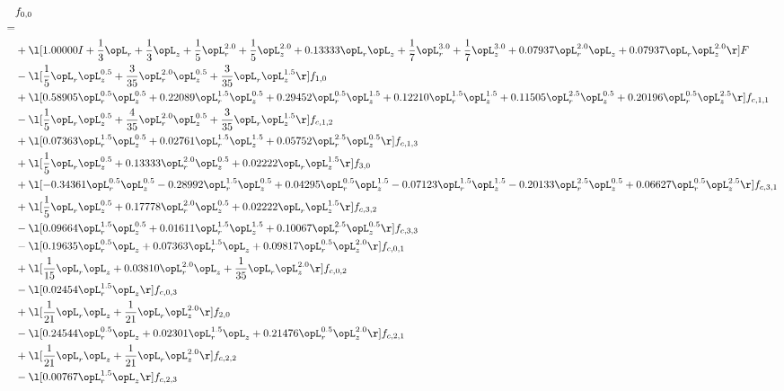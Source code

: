 \begin{alignat}{2} 
\label{eq:f_00_2} 
& f_{0,0} \nonumber \\ 
 = \\ 
& + \l[  1.00000 I + \frac{1}{3} \opL_r + \frac{1}{3} \opL_z + \frac{1}{5} \opL_r^{2.0} + \frac{1}{5} \opL_z^{2.0} +  0.13333 \opL_r \opL_z + \frac{1}{7} \opL_r^{3.0} + \frac{1}{7} \opL_z^{3.0} +  0.07937 \opL_r^{2.0} \opL_z +  0.07937 \opL_r \opL_z^{2.0}  \r] F \nonumber \\ 
& - \l[ \frac{1}{5} \opL_r \opL_z^{0.5} + \frac{3}{35} \opL_r^{2.0} \opL_z^{0.5} + \frac{3}{35} \opL_r \opL_z^{1.5}  \r] f_{1,0} \nonumber \\ 
& + \l[  0.58905 \opL_r^{0.5} \opL_z^{0.5} +  0.22089 \opL_r^{1.5} \opL_z^{0.5} +  0.29452 \opL_r^{0.5} \opL_z^{1.5} +  0.12210 \opL_r^{1.5} \opL_z^{1.5} +  0.11505 \opL_r^{2.5} \opL_z^{0.5} +  0.20196 \opL_r^{0.5} \opL_z^{2.5}  \r] f_{c,1,1} \nonumber \\ 
& - \l[ \frac{1}{5} \opL_r \opL_z^{0.5} + \frac{4}{35} \opL_r^{2.0} \opL_z^{0.5} + \frac{3}{35} \opL_r \opL_z^{1.5}  \r] f_{c,1,2} \nonumber \\ 
& + \l[  0.07363 \opL_r^{1.5} \opL_z^{0.5} +  0.02761 \opL_r^{1.5} \opL_z^{1.5} +  0.05752 \opL_r^{2.5} \opL_z^{0.5}  \r] f_{c,1,3} \nonumber \\ 
& + \l[ \frac{1}{5} \opL_r \opL_z^{0.5} +  0.13333 \opL_r^{2.0} \opL_z^{0.5} +  0.02222 \opL_r \opL_z^{1.5}  \r] f_{3,0} \nonumber \\ 
& + \l[  -0.34361 \opL_r^{0.5} \opL_z^{0.5}   -0.28992 \opL_r^{1.5} \opL_z^{0.5} +  0.04295 \opL_r^{0.5} \opL_z^{1.5}   -0.07123 \opL_r^{1.5} \opL_z^{1.5}   -0.20133 \opL_r^{2.5} \opL_z^{0.5} +  0.06627 \opL_r^{0.5} \opL_z^{2.5}  \r] f_{c,3,1} \nonumber \\ 
& + \l[ \frac{1}{5} \opL_r \opL_z^{0.5} +  0.17778 \opL_r^{2.0} \opL_z^{0.5} +  0.02222 \opL_r \opL_z^{1.5}  \r] f_{c,3,2} \nonumber \\ 
& - \l[  0.09664 \opL_r^{1.5} \opL_z^{0.5} +  0.01611 \opL_r^{1.5} \opL_z^{1.5} +  0.10067 \opL_r^{2.5} \opL_z^{0.5}  \r] f_{c,3,3} \nonumber \\ 
& - \l[  0.19635 \opL_r^{0.5} \opL_z +  0.07363 \opL_r^{1.5} \opL_z +  0.09817 \opL_r^{0.5} \opL_z^{2.0}  \r] f_{c,0,1} \nonumber \\ 
& + \l[ \frac{1}{15} \opL_r \opL_z +  0.03810 \opL_r^{2.0} \opL_z + \frac{1}{35} \opL_r \opL_z^{2.0}  \r] f_{c,0,2} \nonumber \\ 
& - \l[  0.02454 \opL_r^{1.5} \opL_z  \r] f_{c,0,3} \nonumber \\ 
& + \l[ \frac{1}{21} \opL_r \opL_z + \frac{1}{21} \opL_r \opL_z^{2.0}  \r] f_{2,0} \nonumber \\ 
& - \l[  0.24544 \opL_r^{0.5} \opL_z +  0.02301 \opL_r^{1.5} \opL_z +  0.21476 \opL_r^{0.5} \opL_z^{2.0}  \r] f_{c,2,1} \nonumber \\ 
& + \l[ \frac{1}{21} \opL_r \opL_z + \frac{1}{21} \opL_r \opL_z^{2.0}  \r] f_{c,2,2} \nonumber \\ 
& - \l[  0.00767 \opL_r^{1.5} \opL_z  \r] f_{c,2,3} \nonumber \\ 
\end{alignat} 


